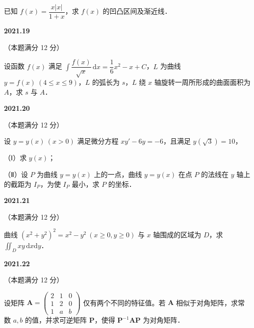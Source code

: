 \documentclass[UTF8,12pt,fontset=windows]{ctexart}
\begin{document}
已知 $f(x) = \dfrac{x|x|}{1+x}$，求 $f(x)$ 的凹凸区间及渐近线．

\vfill
\newpage
{\large\bfseries 2021.19}

（本题满分 12 分）

设函数 $f(x)$ 满足 $\displaystyle\int \dfrac{f(x)}{\sqrt{x}}\,\mathrm{d}x = \dfrac{1}{6}x^2 - x + C$，$L$ 为曲线 $y = f(x)\ (4 \leqslant x \leqslant 9)$，$L$ 的弧长为 $s$，$L$ 绕 $x$ 轴旋转一周所形成的曲面面积为 $A$，求 $s$ 与 $A$．

\vfill
\newpage
{\large\bfseries 2021.20}

（本题满分 12 分）

设 $y = y(x)\ (x > 0)$ 满足微分方程 $xy' - 6y = -6$，且满足 $y(\sqrt{3}) = 10$，

（Ⅰ）求 $y(x)$；

（Ⅱ）设 $P$ 为曲线 $y = y(x)$ 上的一点，曲线 $y = y(x)$ 在点 $P$ 的法线在 $y$ 轴上的截距为 $I_P$，为使 $I_P$ 最小，求 $P$ 的坐标．

\vfill
\newpage
{\large\bfseries 2021.21}

（本题满分 12 分）

曲线 $(x^2 + y^2)^2 = x^2 - y^2\ (x \geqslant 0, y \geqslant 0)$ 与 $x$ 轴围成的区域为 $D$，求 $\displaystyle\iint_D xy\,\mathrm{d}x\mathrm{d}y$．

\vfill
\newpage
{\large\bfseries 2021.22}

（本题满分 12 分）

设矩阵 $\boldsymbol{A} = \begin{pmatrix} 2 & 1 & 0 \\ 1 & 2 & 0 \\ 1 & a & b \end{pmatrix}$ 仅有两个不同的特征值。若 $\boldsymbol{A}$ 相似于对角矩阵，求常数 $a, b$ 的值，并求可逆矩阵 $\boldsymbol{P}$，使得 $\boldsymbol{P}^{-1}\boldsymbol{A}\boldsymbol{P}$ 为对角矩阵．

\vfill
\end{document}
